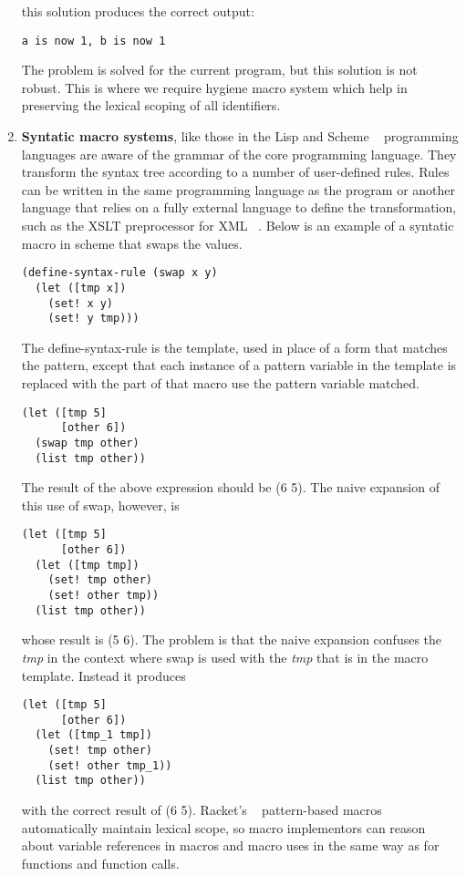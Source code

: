 \begin{enumerate}
this solution produces the correct output:
\begin{lstlisting}[frame=single]
a is now 1, b is now 1
\end{lstlisting}
The problem is solved for the current program, but this solution is not robust. This is where we require hygiene macro system which help in preserving the lexical scoping of all identifiers.

\item {\bf Syntatic macro systems}, like those in the Lisp and Scheme ~\cite{bib12} programming languages are aware of the grammar of the core programming language. They transform the syntax tree according to a number of user-defined rules. Rules can be written in the same programming language as the program or another language that relies on a fully external language to define the transformation, such as the XSLT preprocessor for XML ~\cite{bib3}. Below is an example of a syntatic macro in scheme that swaps the values.
\begin{lstlisting}[frame=single]
(define-syntax-rule (swap x y)
  (let ([tmp x])
    (set! x y)
    (set! y tmp))) 
\end{lstlisting}
The define-syntax-rule is the template, used in place of a form that matches the pattern, except that each instance of a pattern variable in the template is replaced with the part of that macro use the pattern variable matched. 
\begin{lstlisting}[frame=single]
(let ([tmp 5]
      [other 6])
  (swap tmp other)
  (list tmp other))
\end{lstlisting}  
The result of the above expression should be (6 5). The naive expansion of this use of swap, however, is
\begin{lstlisting}[frame=single]
(let ([tmp 5]
      [other 6])
  (let ([tmp tmp])
    (set! tmp other)
    (set! other tmp))
  (list tmp other))
\end{lstlisting} 
 whose result is (5 6). The problem is that the naive expansion confuses the \textit{tmp} in the context where swap is used with the \textit{tmp} that is in the macro template. Instead it produces
 
 \begin{lstlisting}[frame=single]
 (let ([tmp 5]
      [other 6])
  (let ([tmp_1 tmp])
    (set! tmp other)
    (set! other tmp_1))
  (list tmp other))
 \end{lstlisting}  
with the correct result of (6 5). Racket's ~\cite{bib14}  pattern-based macros automatically maintain lexical scope, so macro implementors can reason about variable references in macros and macro uses in the same way as for functions and function calls.
\end{enumerate}

